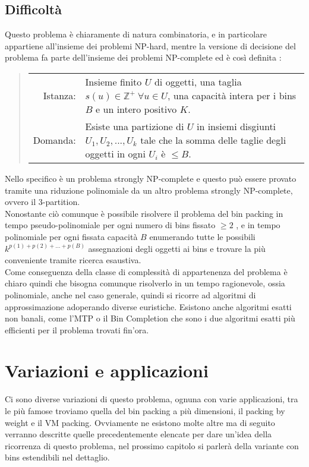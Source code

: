 \subsection{Difficoltà}
Questo problema è chiaramente di natura combinatoria, e in particolare appartiene all'insieme dei problemi NP-hard, mentre
la versione di decisione del problema fa parte dell'insieme dei problemi NP-complete ed è così definita \cite{CaI_NP}:
\begin{quote}\def\arraystretch{1.2}
    \begin{tabularx}{\linewidth}{@{} rX @{}}
        Istanza: & Insieme finito $ U $ di oggetti, una taglia $ s(u) \in \mathbb{Z}^+ \: \forall u \in U $, una capacità intera
                        per i bins $ B $ e un intero positivo $ K $. \\
        Domanda: & Esiste una partizione di $ U $ in insiemi disgiunti $ U_1, U_2, ..., U_k $ tale che la somma delle taglie degli
                        oggetti in ogni $ U_i $ è $ \leq B $.
    \end{tabularx}
\end{quote}
Nello specifico è un problema strongly NP-complete e questo può essere provato tramite una riduzione polinomiale da un altro
problema strongly NP-complete, ovvero il 3-partition. \\
Nonostante ciò comunque è possibile risolvere il problema del bin packing in tempo pseudo-polinomiale per ogni numero di
bins fissato $ \geq 2 $ \cite{BinPackingFixedSize}, e in tempo polinomiale per
ogni fissata capacità $ B $ enumerando tutte le possibili $ k^{p(1) + p(2) + ... + p(B)} $ assegnazioni degli oggetti ai
bins e trovare la più conveniente tramite ricerca esaustiva. \\
Come conseguenza della classe di complessità di appartenenza del problema è chiaro quindi che bisogna comunque risolverlo
in un tempo ragionevole, ossia polinomiale, anche nel caso generale, quindi si ricorre ad algoritmi
di approssimazione adoperando diverse euristiche.
Esistono anche algoritmi esatti non banali, come l'MTP \cite{MTP} o il Bin Completion \cite{BinCompletion} che sono i due
algoritmi esatti più efficienti per il problema trovati fin'ora.


\section{Variazioni e applicazioni}
Ci sono diverse variazioni di questo problema, ognuna con varie applicazioni, tra le più famose troviamo quella
del bin packing a più dimensioni, il packing by weight e il VM packing. Ovviamente ne esistono molte altre ma di seguito 
verranno descritte quelle precedentemente elencate per dare un'idea della ricorrenza di questo problema, nel prossimo 
capitolo si parlerà della variante con bins estendibili nel dettaglio.


